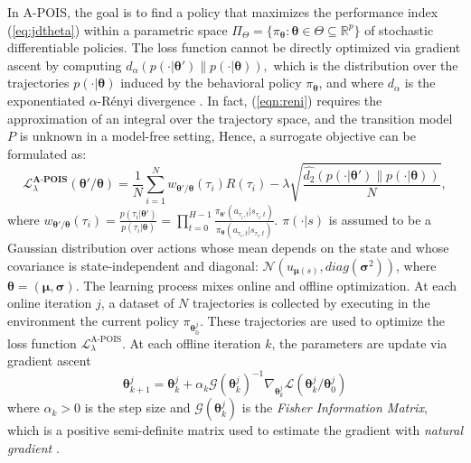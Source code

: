 In A-POIS, the goal is to find a policy that maximizes the performance index (\ref{eq:jdtheta}) within a parametric space \(\Pi_\Theta = \{ \pi_{\boldsymbol \theta}:\boldsymbol \theta \in \Theta \subseteq \mathbb{R}^p\}\) of stochastic differentiable policies.
The loss function cannot be directly optimized via gradient ascent by computing \(d_\alpha (p(\cdot|\boldsymbol \theta')\|p(\cdot|\boldsymbol \theta)),\label{eqn:reni} \) which is the distribution over the trajectories $p(\cdot|\boldsymbol \theta)$ induced by the behavioral policy $\pi_{\boldsymbol \theta}$, and where $d_\alpha$ is the exponentiated $\alpha$-R\'{e}nyi divergence \cite{reny}. In fact, (\ref{eqn:reni}) requires the approximation of an integral over the trajectory space, and the transition model $P$ is unknown in a model-free setting, 
Hence, a surrogate objective can be formulated as:
\begin{equation}
\mathcal{L}_\lambda^{\boldsymbol {\text{A-POIS}}}
(\boldsymbol \theta'/ \boldsymbol
\theta)=\frac{1}{N} \sum^N_{i=1}w_{\boldsymbol \theta'/\boldsymbol \theta}(\tau_i)R(\tau_i)-\lambda\sqrt{\frac{\hat{d_2}(p(\cdot|\boldsymbol \theta')\|p(\cdot|\boldsymbol \theta))}{N}},\end{equation} 
where \(w_{\boldsymbol \theta'/\boldsymbol \theta}(\tau_i)=\frac{p(\tau_i|\boldsymbol \theta')}{p(\tau_i|\boldsymbol \theta)}=\prod^{H-1}_{t=0}\frac{\pi_{\boldsymbol \theta'}(a_{\tau_i,t}|s_{\tau_i,t})}{\pi_{\boldsymbol \theta}(a_{\tau_i,t}|s_{\tau_i,t})}.\)
\(\pi(\cdot|s)\) is assumed to be a Gaussian distribution over actions whose mean depends on the state and whose covariance is state-independent and diagonal: \(\mathcal{N}(u_{\boldsymbol \mu(s)},diag(\boldsymbol \sigma^2))\), where $\boldsymbol \theta=(\boldsymbol \mu,\boldsymbol \sigma)$.
The learning process mixes online and offline optimization. At each online iteration $j$, a dataset of $N$ trajectories is collected by executing in the environment the current policy $\pi_{\boldsymbol \theta_{0}^j}$. These trajectories are used to optimize the loss function \(\mathcal{L}^{\text{A-POIS}}_\lambda\). At each offline iteration $k$, the parameters are update via gradient ascent \begin{equation}\boldsymbol \theta^j_{k+1}=\boldsymbol \theta^j_k+\alpha_k\mathcal{G}(\boldsymbol \theta^j_k)^{-1}\nabla_{\boldsymbol \theta^j_k}\mathcal{L}(\boldsymbol \theta^j_k/\boldsymbol \theta^j_0) \end{equation} where $\alpha_k > 0$ is the step size and $\mathcal{G}(\boldsymbol \theta^j_k)$ is the \textit{Fisher Information Matrix}, which is a positive semi-definite matrix used to estimate the gradient with \textit{natural gradient} \cite{fisher}.


